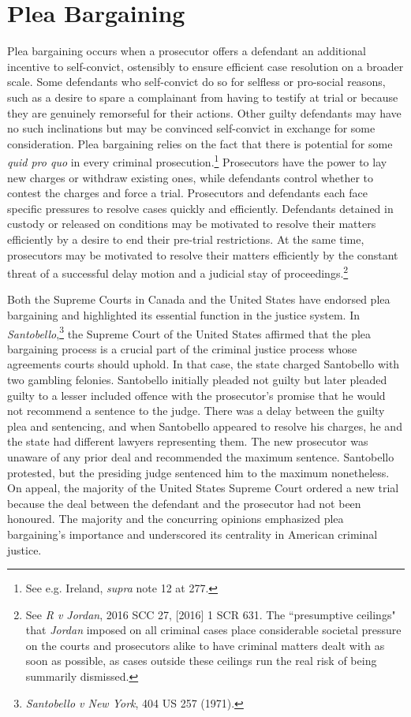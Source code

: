 \section{Plea Bargaining}

Plea bargaining occurs when a prosecutor offers a defendant an additional incentive to self-convict, ostensibly to ensure efficient case resolution on a broader scale. Some defendants who self-convict do so for selfless or pro-social reasons, such as a desire to spare a complainant from having to testify at trial or because they are genuinely remorseful for their actions. Other guilty defendants may have no such inclinations but may be convinced self-convict in exchange for some consideration. Plea bargaining relies on the fact that there is potential for some \textit{quid pro quo} in every criminal prosecution.\footnote{See e.g. Ireland, \textit{supra} note 12 at 277.} Prosecutors have the power to lay new charges or withdraw existing ones, while defendants control whether to contest the charges and force a trial. Prosecutors and defendants each face specific pressures to resolve cases quickly and efficiently. Defendants detained in custody or released on conditions may be motivated to resolve their matters efficiently by a desire to end their pre-trial restrictions. At the same time, prosecutors may be motivated to resolve their matters efficiently by the constant threat of a successful delay motion and a judicial stay of proceedings.\footnote{See \textit{R v Jordan}, 2016 SCC 27, [2016] 1 SCR 631. The ``presumptive ceilings" that \textit{Jordan} imposed on all criminal cases place considerable societal pressure on the courts and prosecutors alike to have criminal matters dealt with as soon as possible, as cases outside these ceilings run the real risk of being summarily dismissed.}

Both the Supreme Courts in Canada and the United States have endorsed plea bargaining and highlighted its essential function in the justice system. In \textit{Santobello},\footnote{\textit{Santobello v New York}, 404 US 257 (1971).} the Supreme Court of the United States affirmed that the plea bargaining process is a crucial part of the criminal justice process whose agreements courts should uphold. In that case, the state charged Santobello with two gambling felonies. Santobello initially pleaded not guilty but later pleaded guilty to a lesser included offence with the prosecutor's promise that he would not recommend a sentence to the judge. There was a delay between the guilty plea and sentencing, and when Santobello appeared to resolve his charges, he and the state had different lawyers representing them. The new prosecutor was unaware of any prior deal and recommended the maximum sentence. Santobello protested, but the presiding judge sentenced him to the maximum nonetheless. On appeal, the majority of the United States Supreme Court ordered a new trial because the deal between the defendant and the prosecutor had not been honoured. The majority and the concurring opinions emphasized plea bargaining's importance and underscored its centrality in American criminal justice.

